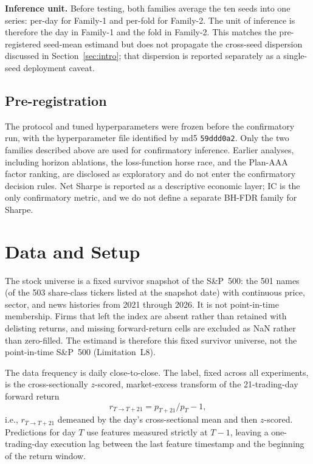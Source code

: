 \documentclass[sigconf,nonacm]{acmart}
\begin{document}
\textbf{Inference unit.} Before testing, both families average the ten seeds into one series: per-day for Family-1 and per-fold for Family-2. The unit of inference is therefore the day in Family-1 and the fold in Family-2. This matches the pre-registered seed-mean estimand but does not propagate the cross-seed dispersion discussed in Section~\ref{sec:intro}; that dispersion is reported separately as a single-seed deployment caveat.

\subsection{Pre-registration}
The protocol and tuned hyperparameters were frozen before the confirmatory run, with the hyperparameter file identified by md5 \texttt{59ddd0a2}. Only the two families described above are used for confirmatory inference. Earlier analyses, including horizon ablations, the loss-function horse race, and the Plan-AAA factor ranking, are disclosed as exploratory and do not enter the confirmatory decision rules. Net Sharpe is reported as a descriptive economic layer; IC is the only confirmatory metric, and we do not define a separate BH-FDR family for Sharpe.

\section{Data and Setup}\label{sec:data}

The stock universe is a fixed survivor snapshot of the S\&P~500: the 501 names (of the 503 share-class tickers listed at the snapshot date) with continuous price, sector, and news histories from 2021 through 2026. It is not point-in-time membership. Firms that left the index are absent rather than retained with delisting returns, and missing forward-return cells are excluded as NaN rather than zero-filled. The estimand is therefore this fixed survivor universe, not the point-in-time S\&P~500 (Limitation~L8).

The data frequency is daily close-to-close. The label, fixed across all experiments, is the cross-sectionally $z$-scored, market-excess transform of the 21-trading-day forward return
\[
r_{T\to T+21}=p_{T+21}/p_T-1,
\]
i.e., $r_{T\to T+21}$ demeaned by the day's cross-sectional mean and then $z$-scored. Predictions for day $T$ use features measured strictly at $T{-}1$, leaving a one-trading-day execution lag between the last feature timestamp and the beginning of the return window.
\end{document}
